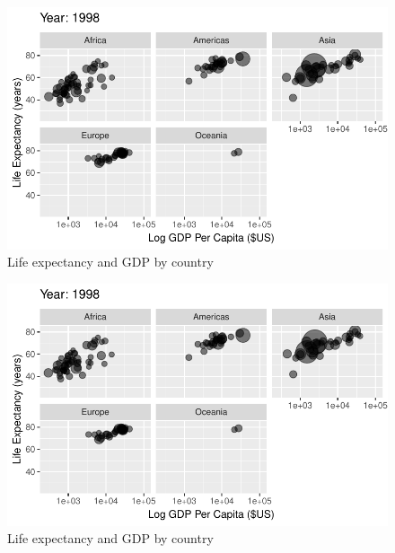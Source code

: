 \documentclass[
  letterpaper,
  DIV=11,
  numbers=noendperiod]{scrreport}
\theoremstyle{definition}
\theoremstyle{remark}
\begin{document}
\begin{figure}

{\centering \includegraphics{index_files/figure-pdf/fig-anim-lifegdp-83.pdf}

}

\caption{\label{fig-anim-lifegdp-83}Life expectancy and GDP by country}

\end{figure}

\begin{figure}

{\centering \includegraphics{index_files/figure-pdf/fig-anim-lifegdp-84.pdf}

}

\caption{\label{fig-anim-lifegdp-84}Life expectancy and GDP by country}

\end{figure}
\end{document}
